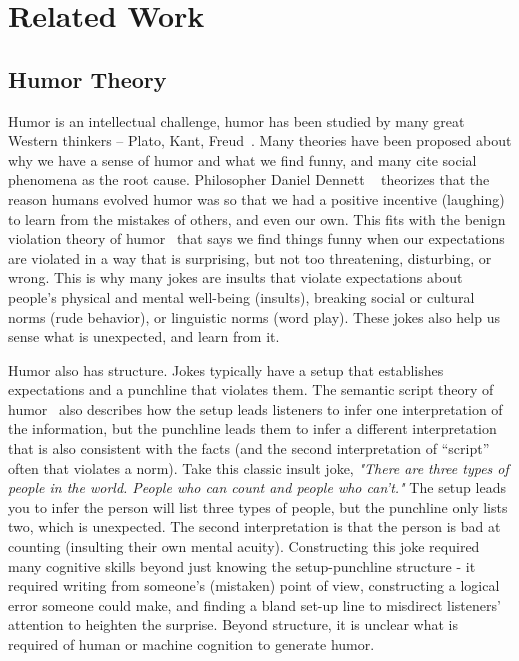 \section{Related Work}
\subsection{Humor Theory}

Humor is an intellectual challenge, humor has been studied by many great Western thinkers – Plato, Kant, Freud~\cite{sep_humor}.
Many theories have been proposed about why we have a sense of humor and what we find funny, and many cite social phenomena as the root cause.
Philosopher Daniel Dennett ~\cite{hurley2011inside} theorizes that the reason humans evolved humor was so that we had a positive incentive (laughing) to learn from the mistakes of others, and even our own. This fits with the benign violation theory of humor~\cite{Raskin2009} that says we find things funny when our expectations are violated in a way that is surprising, but not too threatening, disturbing, or wrong. This is why many jokes are insults that violate expectations about people's physical and mental well-being (insults), breaking social or cultural norms (rude behavior), or linguistic norms (word play). These jokes also help us sense what is unexpected, and learn from it.

Humor also has structure. Jokes typically have a setup that establishes expectations and a punchline that violates them. The semantic script theory of humor~\cite{Raskin2009} also describes how the setup leads listeners to infer one interpretation of the information, but the punchline leads them to infer a different interpretation that is also consistent with the facts (and the second interpretation of ``script'' often that violates a norm). Take this classic insult joke, \textit{"There are three types of people in the world. People who can count and people who can't."} The setup leads you to infer the person will list three types of people, but the punchline only lists two, which is unexpected. The second interpretation is that the person is bad at counting (insulting their own mental acuity). Constructing this joke required many cognitive skills beyond just knowing the setup-punchline structure - it required writing from someone's (mistaken) point of view, constructing a logical error someone could make, and finding a bland set-up line to misdirect listeners' attention to heighten the surprise. Beyond structure, it is unclear what is required of human or machine cognition to generate humor.

